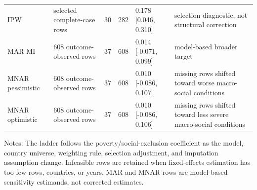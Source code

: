 \begin{tabularx}{\textwidth}{@{}p{}Yrrp{0.18\textwidth}Y@{}}
IPW & selected complete-case rows & 30 & 282 & 0.178 [0.046, 0.310] & selection diagnostic, not structural correction \\
MAR MI & 608 outcome-observed rows & 37 & 608 & 0.014 [-0.071, 0.099] & model-based broader target \\
MNAR pessimistic & 608 outcome-observed rows & 37 & 608 & 0.010 [-0.086, 0.107] & missing rows shifted toward worse macro-social conditions \\
MNAR optimistic & 608 outcome-observed rows & 37 & 608 & 0.010 [-0.086, 0.106] & missing rows shifted toward less severe macro-social conditions \\
\bottomrule
\end{tabularx}

\vspace{0.2em}
\begin{minipage}{0.96\textwidth}\scriptsize Notes: The ladder follows the poverty/social-exclusion coefficient as the model, country universe, weighting rule, selection adjustment, and imputation assumption change. Infeasible rows are retained when fixed-effects estimation has too few rows, countries, or years. MAR and MNAR rows are model-based sensitivity estimands, not corrected estimates.\end{minipage}
\endgroup
